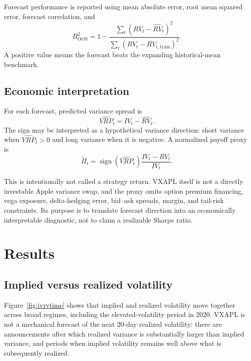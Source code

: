 \documentclass[11pt]{article}
\begin{document}
Forecast performance is reported using mean absolute error, root mean squared error, forecast correlation, and
\begin{equation}
R^2_{\mathrm{OOS}}
=
1-
\frac{\sum_t(RV_t-\widehat{RV}_t)^2}
{\sum_t(RV_t-\overline{RV}_{t,\mathrm{train}})^2}.
\end{equation}
A positive value means the forecast beats the expanding historical-mean benchmark.

\subsection{Economic interpretation}

For each forecast, predicted variance spread is
\begin{equation}
\widehat{VRP}_t=IV_t-\widehat{RV}_t.
\end{equation}
The sign may be interpreted as a hypothetical variance direction: short variance when $\widehat{VRP}_t>0$ and long variance when it is negative. A normalized payoff proxy is
\begin{equation}
\widetilde{\Pi}_t
=
\operatorname{sign}(\widehat{VRP}_t)
\frac{IV_t-RV_t}{IV_t}.
\end{equation}

This is intentionally not called a strategy return. VXAPL itself is not a directly investable Apple variance swap, and the proxy omits option premium financing, vega exposure, delta-hedging error, bid--ask spreads, margin, and tail-risk constraints. Its purpose is to translate forecast direction into an economically interpretable diagnostic, not to claim a realizable Sharpe ratio.

\section{Results}

\subsection{Implied versus realized volatility}

Figure~\ref{fig:ivrvtime} shows that implied and realized volatility move together across broad regimes, including the elevated-volatility period in 2020. VXAPL is not a mechanical forecast of the next 20-day realized volatility: there are announcements after which realized variance is substantially larger than implied variance, and periods when implied volatility remains well above what is subsequently realized.
\end{document}

